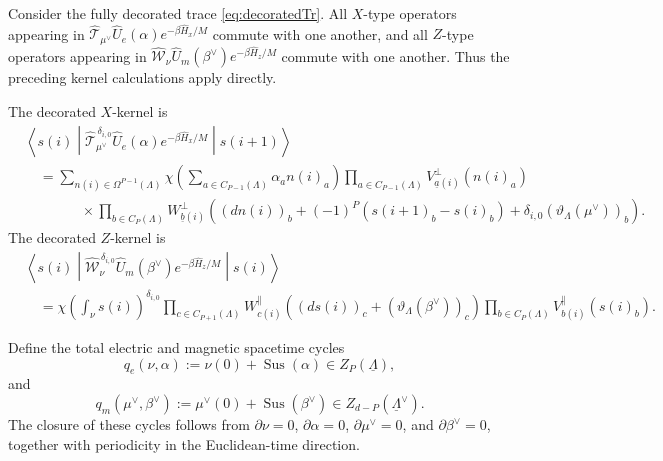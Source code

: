\documentclass[dvipsnames,a4paper]{article}
\numberwithin{equation}{section}
\theoremstyle{definition}
\theoremstyle{remark}
\newcommand{\matrixel}[3]{\left\langle #1 \middle| #2 \middle| #3 \right\rangle}
\newcommand{\Sus}{\operatorname{Sus}}
\begin{document}
Consider the fully decorated trace \eqref{eq:decoratedTr}. All \(X\)-type operators appearing in
\(\hat{\mathcal T}_{\mu^\vee}\hat U_e(\alpha)e^{-\beta\hat H_x/M}\) commute with one
another, and all \(Z\)-type operators appearing in
\(\hat{\mathcal W}_\nu\hat U_m(\beta^\vee)e^{-\beta\hat H_z/M}\) commute with one another.
Thus the preceding kernel calculations apply directly.

The decorated \(X\)-kernel is
\begin{align}
	&\matrixel{s(i)}
	{
		\hat{\mathcal T}_{\mu^\vee}^{\,\delta_{i,0}}
		\hat U_e(\alpha)e^{-\beta\hat H_x/M}
	}
	{s(i+1)}
	\nonumber\\
	&\quad=
	\sum_{n(i)\in\Omega^{P-1}(\Lambda)}
	\chi\left(\sum_{a\in C_{P-1}(\Lambda)}\alpha_a n(i)_a\right)
	\prod_{a\in C_{P-1}(\Lambda)}
	V_{\underline a(i)}^{\perp}\left(n(i)_a\right)
	\nonumber\\
	&\qquad\qquad\times
	\prod_{b\in C_P(\Lambda)}
	W_{\underline b(i)}^{\perp}
	\left(
	(dn(i))_b
	+(-1)^P\left(s(i+1)_b-s(i)_b\right)
	+\delta_{i,0}(\vartheta_\Lambda(\mu^\vee))_b
	\right).
	\label{eq:decorated-x-kernel}
\end{align}
The decorated \(Z\)-kernel is
\begin{align}
	&\matrixel{s(i)}
	{
		\hat{\mathcal W}_\nu^{\,\delta_{i,0}}
		\hat U_m(\beta^\vee)e^{-\beta\hat H_z/M}
	}
	{s(i)}
	\nonumber\\
	&\quad=
	\chi\left(\int_\nu s(i)\right)^{\delta_{i,0}}
	\prod_{c\in C_{P+1}(\Lambda)}
	W_{c(i)}^{\parallel}
	\left((ds(i))_c+(\vartheta_\Lambda(\beta^\vee))_c\right)
	\prod_{b\in C_P(\Lambda)}
	V_{b(i)}^{\parallel}\left(s(i)_b\right).
	\label{eq:decorated-z-kernel}
\end{align}

Define the total electric and magnetic spacetime cycles
\begin{equation}
	q_e(\nu,\alpha)
	:=
	\nu(0)+\Sus(\alpha)\in Z_P(\underline\Lambda),
	\label{eq:total-electric-cycle}
\end{equation}
and
\begin{equation}
	q_m(\mu^\vee,\beta^\vee)
	:=
	\mu^\vee(0)+\Sus(\beta^\vee)\in Z_{d-P}(\underline\Lambda^\vee).
	\label{eq:total-magnetic-cycle}
\end{equation}
The closure of these cycles follows from
\(\partial\nu=0\), \(\partial\alpha=0\), \(\partial\mu^\vee=0\), and
\(\partial\beta^\vee=0\), together with periodicity in the Euclidean-time direction.
\end{document}
